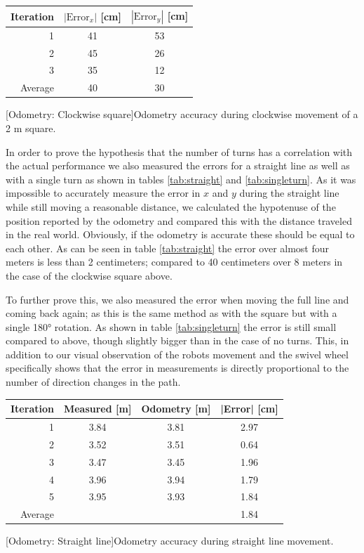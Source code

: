\documentclass[11pt]{article}
\begin{document}
\begin{center}
  \begin{tabular}{r|cc}
    Iteration & $|\text{Error}_x|$ [cm] & $|\text{Error}_y|$ [cm] \\ \hline
    1 & 41 & 53 \\
    2 & 45 & 26 \\
    3 & 35 & 12 \\ \hline
    Average & 40 & 30         
  \end{tabular}
  [Odometry: Clockwise square]{Odometry accuracy during
    clockwise movement of a 2 m square.\label{tab:cw}}\par
\end{center}
In order to prove the hypothesis that the number of turns has a correlation with
the actual performance we also measured the errors for a straight line as well
as with a single turn as shown in tables \ref{tab:straight} and
\vref{tab:singleturn}. As it was impossible to accurately measure the error in
$x$ and $y$ during the straight line while still moving a reasonable distance,
we calculated the hypotenuse of the position reported by the odometry and
compared this with the distance traveled in the real world. Obviously, if the
odometry is accurate these should be equal to each other. As can be seen in
table \ref{tab:straight} the error over almost four meters is less than 2
centimeters; compared to 40 centimeters over 8 meters in the case of the
clockwise square above. \par
To further prove this, we also measured the error when moving the full line and
coming back again; as this is the same method as with the square but with a
single \ang{180} rotation. As shown in table \ref{tab:singleturn} the error is
still small compared to above, though slightly bigger than in the case of no
turns. This, in addition to our visual observation of the robots movement and
the swivel wheel specifically shows that the error in measurements is directly
proportional to the number of direction changes in the path.
\begin{center}\begin{tabular}{r|ccc}
                Iteration & Measured [m] & Odometry [m] & |Error| [cm] \\ \hline
                1 & 3.84 & 3.81 & 2.97 \\
                2 & 3.52 & 3.51 & 0.64 \\
                3 & 3.47 & 3.45 & 1.96 \\
                4 & 3.96 & 3.94 & 1.79 \\
                5 & 3.95 & 3.93 & 1.84 \\ \hline
                Average & & & 1.84
              \end{tabular}
              [Odometry: Straight line]{Odometry accuracy
                during straight line movement.\label{tab:straight}}\par
            \end{center}
\end{document}
